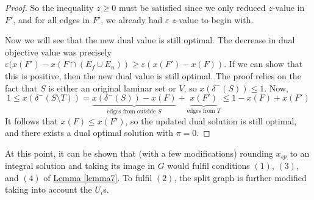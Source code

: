 \documentclass[./main.tex]{subfiles}
\begin{document}
\begin{proof}
			So the inequality $z\geqslant 0$ must be satisfied since we only reduced $z$-value in $F'$, and for all edges in $F'$, we already had $\varepsilon$ $z$-value to begin with.\\\vspace{2mm}

			Now we will see that the new dual value is still optimal.
			The decrease in dual objective value was precisely $\varepsilon (x(F') - x(F\cap( E_f\cup E_n))\geqslant \varepsilon(x(F') - x(F))$.
			If we can show that this is positive, then the new dual value is still optimal. The proof relies on the fact that $S$ is either an original laminar set or $V$, so $x(\delta^-(S))\leqslant 1$.
			Now,
			\[
				1\leqslant x(\delta^-(S\setminus T)) = \underbrace{x(\delta^-(S)) - x(F)}_{\text{edges from outside } S} + \underbrace{x(F')}_{\text{edges from } T}\leqslant 1 - x(F) + x(F')
			\]
			It follows that $x(F)\leqslant x(F')$, so the updated dual solution is still optimal, and there exists a dual optimal solution with $\pi = 0$.
		\end{proof}

		At this point, it can be shown that (with a few modifications) rounding $x_{sp}$ to an integral solution and taking its image in $G$ would fulfil conditions $(1)$, $(3)$, and $(4)$ of \hyperref[lemma7]{Lemma \ref{lemma7}}. To fulfil $(2)$, the split graph is further modified taking into account the $U_i$s.\\
		\vspace{2mm}
\end{document}
